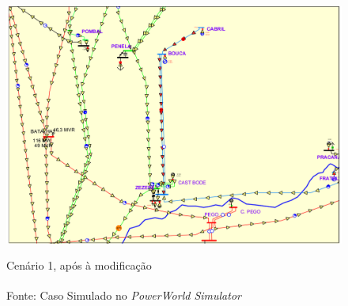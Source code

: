 \begin{figure}[H]
	\centering
	\captionsetup{width=1\textwidth, font=footnotesize, textfont=bf}	
	\includegraphics[width=1\linewidth]{img/caso1After.pdf}
	\caption{Cenário 1, após à modificação}
	\vspace{-3.5mm}
	\caption*{Fonte: Caso Simulado no \textit{PowerWorld\textsuperscript{\textregistered} Simulator}}
	\label{fig:caso1After}
\end{figure}

